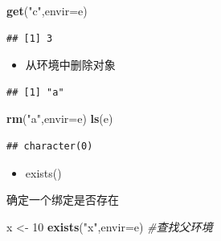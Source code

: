 \documentclass[]{book}
\newenvironment{Shaded}{\begin{snugshade}}{\end{snugshade}}
\newcommand{\KeywordTok}[1]{\textcolor[rgb]{0.13,0.29,0.53}{\textbf{#1}}}
\newcommand{\DataTypeTok}[1]{\textcolor[rgb]{0.13,0.29,0.53}{#1}}
\newcommand{\DecValTok}[1]{\textcolor[rgb]{0.00,0.00,0.81}{#1}}
\newcommand{\StringTok}[1]{\textcolor[rgb]{0.31,0.60,0.02}{#1}}
\newcommand{\CommentTok}[1]{\textcolor[rgb]{0.56,0.35,0.01}{\textit{#1}}}
\newcommand{\OtherTok}[1]{\textcolor[rgb]{0.56,0.35,0.01}{#1}}
\newcommand{\OperatorTok}[1]{\textcolor[rgb]{0.81,0.36,0.00}{\textbf{#1}}}
\newcommand{\NormalTok}[1]{#1}
\providecommand{\tightlist}{%
  \setlength{\itemsep}{0pt}\setlength{\parskip}{0pt}}
\begin{document}
\begin{Shaded}
\begin{Highlighting}[]
\KeywordTok{get}\NormalTok{(}\StringTok{"c"}\NormalTok{,}\DataTypeTok{envir=}\NormalTok{e)}
\end{Highlighting}
\end{Shaded}

\begin{verbatim}
## [1] 3
\end{verbatim}

\begin{itemize}
\tightlist
\item
  从环境中删除对象
\end{itemize}

\begin{Shaded}
\end{Shaded}

\begin{verbatim}
## [1] "a"
\end{verbatim}

\begin{Shaded}
\begin{Highlighting}[]
\KeywordTok{rm}\NormalTok{(}\StringTok{"a"}\NormalTok{,}\DataTypeTok{envir=}\NormalTok{e)}
\KeywordTok{ls}\NormalTok{(e)}
\end{Highlighting}
\end{Shaded}

\begin{verbatim}
## character(0)
\end{verbatim}

\begin{itemize}
\tightlist
\item
  exists()
\end{itemize}

确定一个绑定是否存在

\begin{Shaded}
\begin{Highlighting}[]
\NormalTok{x <-}\StringTok{ }\DecValTok{10}
\KeywordTok{exists}\NormalTok{(}\StringTok{"x"}\NormalTok{,}\DataTypeTok{envir=}\NormalTok{e) }\CommentTok{#查找父环境}
\end{Highlighting}
\end{Shaded}
\end{document}
